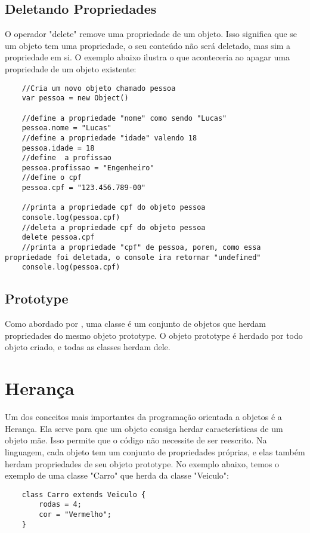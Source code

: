 	\subsection{Deletando Propriedades}
	O operador "delete" remove uma propriedade de um objeto. Isso significa que se um objeto tem uma propriedade, o seu conteúdo não será deletado, mas sim a propriedade em si. O exemplo abaixo ilustra o que aconteceria ao apagar uma propriedade de um objeto existente: \newline
	\newline
	\begin{lstlisting}
	//Cria um novo objeto chamado pessoa
	var pessoa = new Object()
	
	//define a propriedade "nome" como sendo "Lucas"
	pessoa.nome = "Lucas"
	//define a propriedade "idade" valendo 18
	pessoa.idade = 18
	//define  a profissao
	pessoa.profissao = "Engenheiro"
	//define o cpf
	pessoa.cpf = "123.456.789-00"
	
	//printa a propriedade cpf do objeto pessoa
	console.log(pessoa.cpf) 
	//deleta a propriedade cpf do objeto pessoa
	delete pessoa.cpf
	//printa a propriedade "cpf" de pessoa, porem, como essa propriedade foi deletada, o console ira retornar "undefined"
	console.log(pessoa.cpf) 
	\end{lstlisting}
	
	\subsection{Prototype}
	Como abordado por \cite{flanagan2020javascript}, uma classe é um conjunto de objetos que herdam propriedades do mesmo objeto prototype. O objeto prototype é herdado por todo objeto criado, e todas as classes herdam dele.
	
    \section{Heran\c{c}a}
	Um dos conceitos mais importantes da programação orientada a objetos é a Herança. Ela serve para que um objeto consiga herdar características de um objeto mãe. Isso permite que o código não necessite de ser reescrito. Na linguagem, cada objeto tem um conjunto de propriedades próprias, e elas também herdam propriedades de seu objeto prototype. No exemplo abaixo, temos o exemplo de uma classe "Carro" que herda da classe "Veiculo": \newline
	\newline
	\begin{lstlisting}
	class Carro extends Veiculo {
		rodas = 4;
		cor = "Vermelho";
	}
	\end{lstlisting}
	
